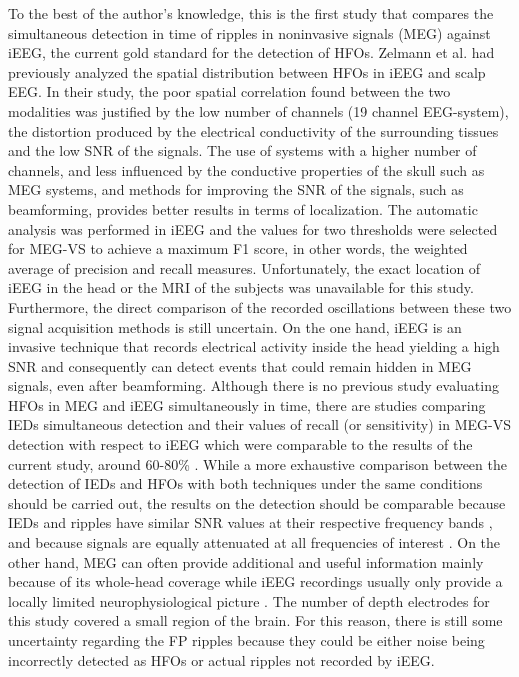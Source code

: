 To the best of the author’s knowledge, this is the first study that compares the simultaneous detection in time of ripples in noninvasive signals (MEG) against iEEG, the current gold standard for the detection of HFOs. Zelmann et al. \citep{Zelmann2014} had previously analyzed the spatial distribution between HFOs in iEEG and scalp EEG. In their study, the poor spatial correlation found between the two modalities was justified by the low number of channels (19 channel EEG-system), the distortion produced by the electrical conductivity of the surrounding tissues and the low SNR of the signals. The use of systems with a higher number of channels, and less influenced by the conductive properties of the skull such as MEG systems, and methods for improving the SNR of the signals, such as beamforming, provides better results in terms of localization. The automatic analysis was performed in iEEG and the values for two thresholds were selected for MEG-VS to achieve a maximum F1 score, in other words, the weighted average of precision and recall measures. Unfortunately, the exact location of iEEG in the head or the MRI of the subjects was unavailable for this study. Furthermore, the direct comparison of the recorded oscillations between these two signal acquisition methods is still uncertain. On the one hand, iEEG is an invasive technique that records electrical activity inside the head yielding a high SNR and consequently can detect events that could remain hidden in MEG signals, even after beamforming. Although there is no previous study evaluating HFOs in MEG and iEEG simultaneously in time, there are studies comparing IEDs simultaneous detection and their values of recall (or sensitivity) in MEG-VS detection with respect to iEEG which were comparable to the results of the current study, around 60-80\% \citep{Bouet2012,Huiskamp2010,Nowak2009}. While a more exhaustive comparison between the detection of IEDs and HFOs with both techniques under the same conditions should be carried out, the results on the detection should be comparable because IEDs and ripples have similar SNR values at their respective frequency bands \citep{vonEllenrieder2012}, and because signals are equally attenuated at all frequencies of interest \citep{Zelmann2014}. On the other hand, MEG can often provide additional and useful information mainly because of its whole-head coverage while iEEG recordings usually only provide a locally limited neurophysiological picture \citep{Muthukumaraswamy2013}. The number of depth electrodes for this study covered a small region of the brain. For this reason, there is still some uncertainty regarding the FP ripples because they could be either noise being incorrectly detected as HFOs or actual ripples not recorded by iEEG. 


